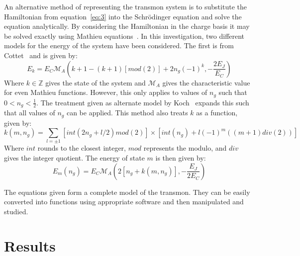\documentclass[11pt]{article}
\begin{document}
An alternative method of representing the transmon system is to substitute the Hamiltonian from equation~\ref{eq:3} into the Schr\"odinger equation and solve the equation analytically.
By considering the Hamiltonian in the charge basis it may be solved exactly using Mathieu equations~\cite{rubyApplicationsMathieuEquation1996}. In this investigation, two different models for the energy of the system have been considered. The first is from Cottet~\cite{cottetImplementationQuantumBit2002} and is given by:
\begin{equation} \label{eq:7}
E_k = E_C \mathcal{M}_A (k+1 - (k+1)[mod(2)] + 2n_g(-1)^k, -\frac{2E_J}{E_C})
\end{equation}
Where $k \in \mathbb{Z}$ gives the state of the system and $\mathcal{M}_A$ gives the characteristic value for even Mathieu functions. However, this only applies to values of $n_g$ such that $0 < n_g < \frac{1}{2}$. The treatment given as alternate model by Koch~\cite{kochChargeinsensitiveQubitDesign2007} expands this such that all values of $n_g$ can be applied. This method also treats $k$ as a function, given by:
\begin{equation} \label{eq:8}
k(m, n_g) = \sum_{l=\pm 1} [int(2n_g + l/2)mod(2)] \times [int(n_g) + l(-1)^m ((m+1)div(2))]
\end{equation}
Where $int$ rounds to the closest integer, $mod$ represents the modulo, and $div$ gives the integer quotient. The energy of state $m$ is then given by:
\begin{equation} \label{eq:9}
E_m(n_g) = E_C \mathcal{M}_A (2[n_g + k(m,n_g)],-\frac{E_J}{2E_C})
\end{equation}

The equations given form a complete model of the transmon. They can be easily converted into functions using appropriate software and then manipulated and studied.

\section{Results}
\end{document}
